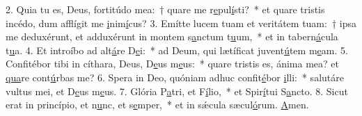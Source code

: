 2. Quia tu es, Deus, fortitúdo mea:~† quare me r\uline{e}pul\uline{í}sti?~* et quare tristis incédo, dum afflígit me \uline{i}nim\uline{í}cus?
3. Emítte lucem tuam et veritátem tuam:~† ipsa me deduxérunt, et adduxérunt in montem s\uline{a}nctum t\uline{u}um,~* et in tabern\uline{á}cula t\uline{u}a.
4. Et introíbo ad alt\uline{á}re D\uline{e}i:~* ad Deum, qui lætíficat juvent\uline{ú}tem m\uline{e}am.
5. Confitébor tibi in cíthara, Deus, D\uline{e}us m\uline{e}us:~* quare tristis es, ánima mea? et \uline{qua}re cont\uline{ú}rbas me?
6. Spera in Deo, quóniam adhuc confit\uline{é}bor \uline{i}lli:~* salutáre vultus mei, et D\uline{e}us m\uline{e}us.
7. Glória P\uline{a}tri, et F\uline{í}lio,~* et Spir\uline{í}tui S\uline{a}ncto.
8. Sicut erat in princípio, et n\uline{u}nc, et s\uline{e}mper,~* et in sǽcula sæcul\uline{ó}rum. \uline{A}men.
